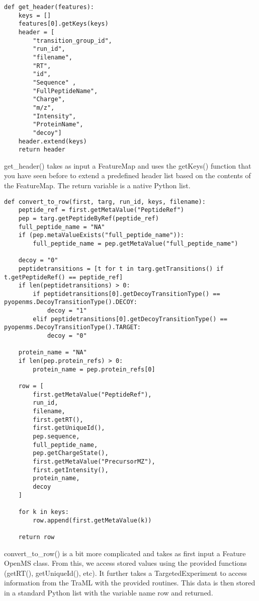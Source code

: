 {\begin{lstlisting}
def get_header(features):
    keys = []
    features[0].getKeys(keys)
    header = [
        "transition_group_id",
        "run_id",
        "filename",
        "RT",
        "id",
        "Sequence" ,
        "FullPeptideName",
        "Charge",
        "m/z",
        "Intensity",
        "ProteinName",
        "decoy"]
    header.extend(keys)
    return header
\end{lstlisting}

get\_header() takes as input a FeatureMap and uses the getKeys() function that you have seen before to extend a predefined header list based on the contents of the FeatureMap. The return variable is a native Python list.

\begin{lstlisting}
def convert_to_row(first, targ, run_id, keys, filename):
    peptide_ref = first.getMetaValue("PeptideRef")
    pep = targ.getPeptideByRef(peptide_ref)
    full_peptide_name = "NA"
    if (pep.metaValueExists("full_peptide_name")):
        full_peptide_name = pep.getMetaValue("full_peptide_name")

    decoy = "0"
    peptidetransitions = [t for t in targ.getTransitions() if t.getPeptideRef() == peptide_ref]
    if len(peptidetransitions) > 0:
        if peptidetransitions[0].getDecoyTransitionType() == pyopenms.DecoyTransitionType().DECOY:
            decoy = "1"
        elif peptidetransitions[0].getDecoyTransitionType() == pyopenms.DecoyTransitionType().TARGET:
            decoy = "0"

    protein_name = "NA"
    if len(pep.protein_refs) > 0:
        protein_name = pep.protein_refs[0]

    row = [
        first.getMetaValue("PeptideRef"),
        run_id,
        filename,
        first.getRT(),
        first.getUniqueId(),
        pep.sequence,
        full_peptide_name,
        pep.getChargeState(),
        first.getMetaValue("PrecursorMZ"),
        first.getIntensity(),
        protein_name,
        decoy
    ]

    for k in keys:
        row.append(first.getMetaValue(k))

    return row
\end{lstlisting}

convert\_to\_row() is a bit more complicated and takes as first input a Feature OpenMS class. From this, we access stored values using the provided functions (getRT(), getUniqueId(), etc). It further takes a TargetedExperiment to access information from the TraML with the provided routines. This data is then stored in a standard Python list with the variable name row and returned.

}
